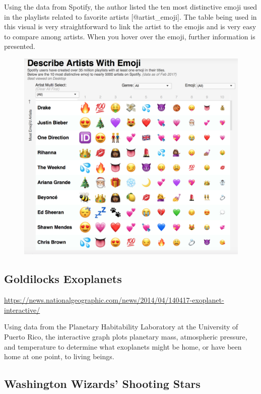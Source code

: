 \documentclass[]{book}
\theoremstyle{definition}
\theoremstyle{definition}
\theoremstyle{definition}
\theoremstyle{remark}
\begin{document}
Using the data from Spotify, the author listed the ten most distinctive
emoji used in the playlists related to favorite artists
{[}@artist\_emoji{]}. The table being used in this visual is very
straightforward to link the artist to the emojis and is very easy to
compare among artists. When you hover over the emoji, further
information is presented.

\begin{figure}
\centering
\includegraphics{images/artist_emoji.png}
\caption{}
\end{figure}

\subsection{Goldilocks Exoplanets}\label{goldilocks-exoplanets}

\url{https://news.nationalgeographic.com/news/2014/04/140417-exoplanet-interactive/}

Using data from the Planetary Habitability Laboratory at the University
of Puerto Rico, the interactive graph plots planetary mass, atmospheric
pressure, and temperature to determine what exoplanets might be home, or
have been home at one point, to living beings.

\subsection{Washington Wizards' Shooting
Stars}\label{washington-wizards-shooting-stars}
\end{document}
